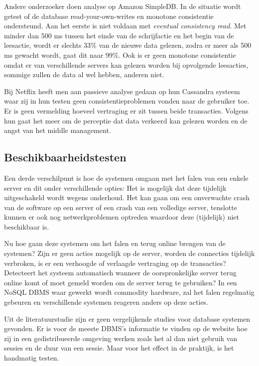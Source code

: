 Andere onderzoeker\cite{wada2011data} doen analyse op Amazon SimpleDB. In de situatie wordt getest of de database read-your-own-writes en monotone consistentie ondersteund. Aan het eerste is niet voldaan met \textit{eventual consistency read}. Met minder dan 500 ms tussen het einde van de schrijfactie en het begin van de leesactie, wordt er slechts 33\% van de nieuwe data gelezen, zodra er meer als 500 ms gewacht wordt, gaat dit naar 99\%. Ook is er geen monotone consistentie omdat er van verschillende servers kan gelezen worden bij opvolgende leesacties, sommige zullen de data al wel hebben, anderen niet. 

Bij Netflix heeft men aan passieve analyse gedaan op hun Cassandra systeem \cite{kalantzisnetflix} waar zij in hun testen geen consistentieproblemen vonden naar de gebruiker toe. Er is geen vermelding hoeveel vertraging er zit tussen beide transacties. Volgens hun gaat het meer om de perceptie dat data verkeerd kan gelezen worden en de angst van het middle management. 

\subsection{Beschikbaarheidstesten}
Een derde verschilpunt is hoe de systemen omgaan met het falen van een enkele server en dit onder verschillende opties: Het is mogelijk dat deze tijdelijk uitgeschakeld wordt wegens onderhoud. Het kan gaan om een onverwachte crash van de software op een server of een crash van een volledige server, tenslotte kunnen er ook nog netwerkproblemen optreden waardoor deze (tijdelijk) niet beschikbaar is. 

Nu hoe gaan deze systemen om het falen en terug online brengen van de systemen? Zijn er geen acties mogelijk op de server, worden de connecties tijdelijk verbroken, is er een verhoogde of verlaagde vertraging op de transacties? Detecteert het systeem automatisch wanneer de oorspronkelijke server terug online komt of moet gemeld worden om de server terug te gebruiken? In een NoSQL DBMS waar gewerkt wordt commodity hardware, zal het falen regelmatig gebeuren en verschillende systemen reageren anders op deze acties. 

Uit de literatuurstudie zijn er geen vergelijkende studies voor database systemen gevonden. Er is voor de meeste DBMS's informatie te vinden op de website hoe zij in een gedistribueerde omgeving werken zoals het al dan niet gebruik van sessies en de duur van een sessie. Maar voor het effect in de praktijk, is het handmatig testen. 

